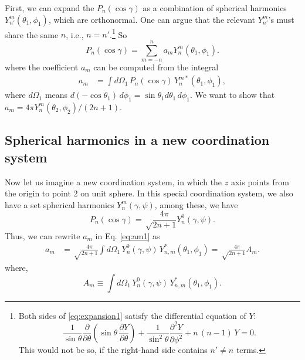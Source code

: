 \documentclass[11pt]{article}
\begin{document}
First, we can expand the $P_n(\cos\gamma)$
as a combination of spherical harmonics $Y_{n'}^m(\theta_1, \phi_1)$,
which are orthonormal.
%
One can argue that the relevant $Y_{n'}^m$'s must share the same $n$,
i.e., $n = n'$.\footnote{
  Both sides of \eqref{eq:expansion1}
  satisfy the differential equation of $Y$:
\[
  \frac{ 1 } { \sin \theta }
  \frac{ \partial } { \partial \theta }
  \left(
    \sin \theta
    \,
    \frac{ \partial Y }{ \partial \theta }
  \right)
  +
  \frac { 1 } { \sin^2 \theta }
  \frac { \partial^2 Y } { \partial \phi^2 }
  + n \, (n - 1)  \, Y = 0.
\]
This would not be so,
if the right-hand side contains $n' \ne n$ terms.
}
%
So
\begin{equation}
  P_n(\cos\gamma)
=
  \sum_{m = -n}^n a_m Y_n^m(\theta_1, \phi_1).
  \label{eq:expansion1}
\end{equation}
%
where the coefficient $a_m$ can be computed from the integral
\begin{align}
  a_m
&=
\int d\Omega_1 \, P_n(\cos\gamma) \, Y_n^{m*}(\theta_1, \phi_1),
\label{eq:am1}
\end{align}
where $d\Omega_1$ means
$d(-\cos\theta_1) \, d\phi_1 = \sin\theta_1 d\theta_1 \, d\phi_1$.
%
We want to show that
$a_m = 4 \pi Y_n^m(\theta_2, \phi_2)/ ( 2 n + 1 )$.



\subsection{Spherical harmonics in a new coordination system}



Now let us imagine a new coordination system,
in which the $z$ axis points from the origin to point 2 on unit sphere.
%
In this special coordination system,
we also have a set spherical harmonics $Y_n^m(\gamma, \psi)$,
among these, we have
\[
  P_n(\cos\gamma)
=
\sqrt \frac { 4 \pi } { 2 n + 1 }
  Y_n^0(\gamma, \psi).
\]
Thus, we can rewrite $a_m$ in Eq. \eqref{eq:am1} as
\begin{align}
a_m
&=
\sqrt \frac{4 \pi}{ 2 n + 1 }
\int d\Omega_1 \, Y_n^0(\gamma, \psi) \, Y^*_{n,m}(\theta_1, \phi_1)
=
\sqrt \frac{4 \pi}{ 2 n + 1 } A_m.
\label{eq:am2}
\end{align}
%
where,
\begin{equation}
A_m
\equiv
\int d\Omega_1 \, Y_n^0(\gamma, \psi) \, Y^*_{n,m}(\theta_1, \phi_1).
\label{eq:Am}
\end{equation}
\end{document}
